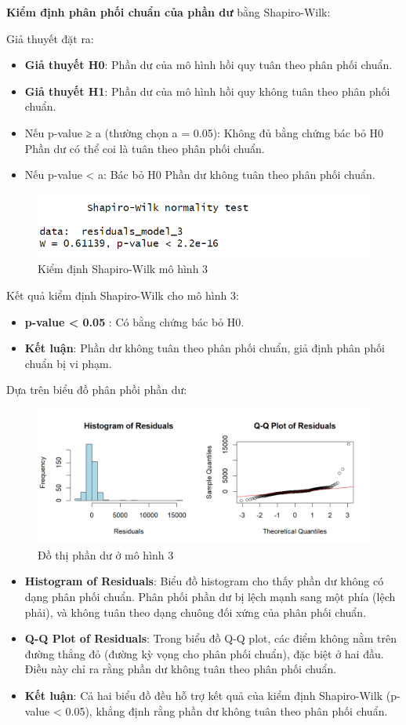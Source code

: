 \textbf{Kiểm định phân phối chuẩn của phần dư} bằng Shapiro-Wilk:

Giả thuyết đặt ra:
\begin{itemize}
  \item\textbf{Giả thuyết H0}: Phần dư của mô hình hồi quy tuân theo phân phối chuẩn.
  \item\textbf{Giả thuyết H1}: Phần dư của mô hình hồi quy không tuân theo phân phối chuẩn.
  \item Nếu p-value ≥ a (thường chọn a = 0.05): Không đủ bằng chứng bác bỏ H0 \rightarrow Phần dư có thể coi là tuân theo phân phối chuẩn.
  \item Nếu p-value < a: Bác bỏ H0 \rightarrow Phần dư không tuân theo phân phối chuẩn.
\end{itemize}

\begin{figure}[H]
  \centering
  \includegraphics[width=0.7\linewidth]{graphics/5.5.6.png}
  \caption{Kiểm định Shapiro-Wilk mô hình 3 }
\end{figure}

Kết quả kiểm định Shapiro-Wilk cho mô hình 3:
\begin{itemize}
  \item\textbf{p-value < 0.05 }: Có bằng chứng bác bỏ H0.
  \item\textbf{Kết luận}: Phần dư không tuân theo phân phối chuẩn, giả định phân phối chuẩn bị vi phạm.
\end{itemize}

Dựa trên biểu đồ phân phồi phần dư:
\begin{figure}[H]
  \centering
  \includegraphics[width=0.7\linewidth]{graphics/5.5.9.png}
  \caption{Đồ thị phần dư ở mô hình 3}
\end{figure}

\begin{itemize}
  \item\textbf{Histogram of Residuals}: Biểu đồ histogram cho thấy phần dư không có dạng phân phối chuẩn. Phân phối phần dư bị lệch mạnh sang một phía (lệch phải), và không tuân theo dạng chuông đối xứng của phân phối chuẩn.
  \item\textbf{Q-Q Plot of Residuals}: Trong biểu đồ Q-Q plot, các điểm không nằm trên đường thẳng đỏ (đường kỳ vọng cho phân phối chuẩn), đặc biệt ở hai đầu. Điều này chỉ ra rằng phần dư không tuân theo phân phối chuẩn.
  \item\textbf{Kết luận}: Cả hai biểu đồ đều hỗ trợ kết quả của kiểm định Shapiro-Wilk (p-value < 0.05), khẳng định rằng phần dư không tuân theo phân phối chuẩn.
\end{itemize}

